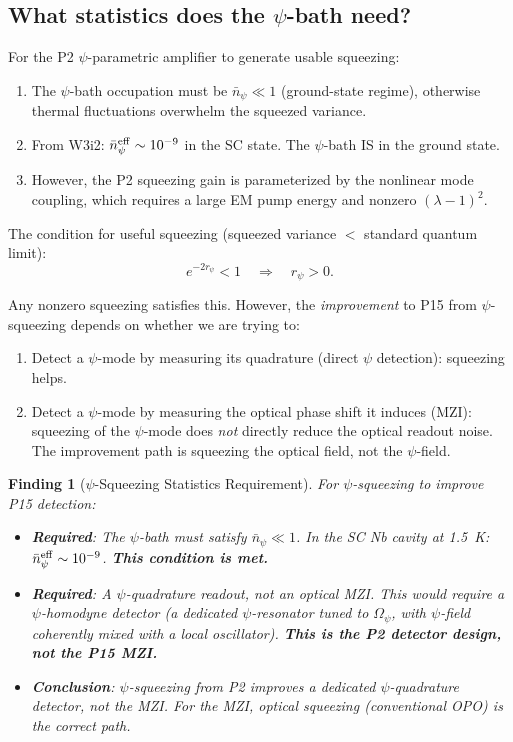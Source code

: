 \documentclass[11pt]{article}
\newtheorem{finding}{Finding}
\newcommand{\Opsi}{\Omega_\psi}
\newcommand{\lam}{\lambda}
\begin{document}
\subsection{What statistics does the $\psi$-bath need?}

For the P2 $\psi$-parametric amplifier to generate usable squeezing:
\begin{enumerate}
\item The $\psi$-bath occupation must be $\bar{n}_\psi \ll 1$ (ground-state regime),
otherwise thermal fluctuations overwhelm the squeezed variance.
\item From W3i2: $\bar{n}_\psi^{\rm eff} \sim 10^{-9}$ in the SC state. The
$\psi$-bath IS in the ground state.
\item However, the P2 squeezing gain is parameterized by the nonlinear mode
coupling, which requires a large EM pump energy and nonzero $(\lam-1)^2$.

\end{enumerate}

The condition for useful squeezing (squeezed variance $<$ standard quantum limit):
\begin{equation}
e^{-2r_\psi} < 1 \quad \Rightarrow \quad r_\psi > 0.
\end{equation}

Any nonzero squeezing satisfies this. However, the \emph{improvement} to P15
from $\psi$-squeezing depends on whether we are trying to:
\begin{enumerate}
\item Detect a $\psi$-mode by measuring its quadrature (direct $\psi$ detection):
squeezing helps.
\item Detect a $\psi$-mode by measuring the optical phase shift it induces (MZI):
squeezing of the $\psi$-mode does \emph{not} directly reduce the optical
readout noise. The improvement path is squeezing the optical field, not the
$\psi$-field.
\end{enumerate}

\begin{finding}[$\psi$-Squeezing Statistics Requirement]
\label{find:psi-squeezing-stats}
For $\psi$-squeezing to improve P15 detection:
\begin{itemize}
\item \textbf{Required}: The $\psi$-bath must satisfy $\bar{n}_\psi \ll 1$.
In the SC Nb cavity at 1.5~K: $\bar{n}_\psi^{\rm eff} \sim 10^{-9}$.
\textbf{This condition is met.}
\item \textbf{Required}: A $\psi$-quadrature readout, not an optical MZI.
This would require a $\psi$-homodyne detector (a dedicated $\psi$-resonator
tuned to $\Opsi$, with $\psi$-field coherently mixed with a local oscillator).
\textbf{This is the P2 detector design, not the P15 MZI.}
\item \textbf{Conclusion}: $\psi$-squeezing from P2 improves a dedicated
$\psi$-quadrature detector, not the MZI. For the MZI, optical squeezing
(conventional OPO) is the correct path.
\end{itemize}
\end{finding}
\end{document}
